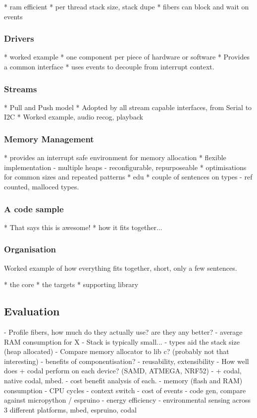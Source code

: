 * ram efficient
* per thread stack size, stack dupe
* fibers can block and wait on events

\subsubsection{Drivers}

* worked example
* one component per piece of hardware or software
* Provides a common interface
* uses events to decouple from interrupt context.

\subsubsection{Streams}

* Pull and Push model
* Adopted by all stream capable interfaces, from Serial to I2C
* Worked example, audio recog, playback

\subsubsection{Memory Management}

* provides an interrupt safe environment for memory allocation
* flexible implementation
    - multiple heaps
    - reconfigurable, repurposeable
* optimisations for common sizes and repeated patterns
* edu
* couple of sentences on types
    - ref counted, malloced types.

\subsubsection{A code sample}

* That says this is awesome!
* how it fits together...

\subsubsection{Organisation}

Worked example of how everything fits together, short, only a few sentences.

* the core
* the targets
* supporting library


\subsection{Evaluation}

- Profile fibers, how much do they actually use? are they any better?
    - average RAM consumption for X
    - Stack is typically small...
    - types aid the stack size (heap allocated)
- Compare memory allocator to lib c? (probably not that interesting)
- benefits of componentisation?
    - reusability, extensibility
- How well does \MC + codal perform on each device? (SAMD, ATMEGA, NRF52)
    - \MC + codal, native codal, mbed.
    - cost benefit analysis of each.
    - memory (flash and RAM) consumption
    - CPU cycles
        - context switch
        - cost of events
        - code gen, compare against micropython / espruino
    - energy efficiency
        - environmental sensing across 3 different platforms, mbed, espruino, codal